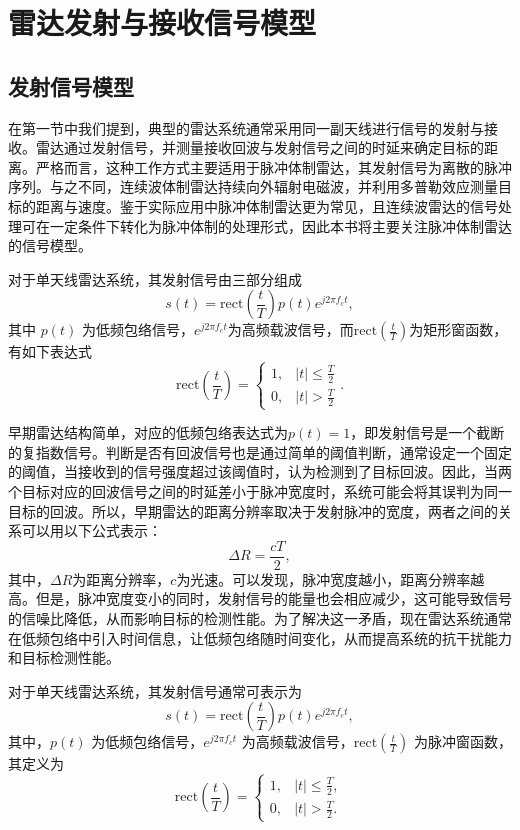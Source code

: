 \chapter{雷达发射与接收信号模型}

\section{发射信号模型}
在第一节中我们提到，典型的雷达系统通常采用同一副天线进行信号的发射与接收。雷达通过发射信号，并测量接收回波与发射信号之间的时延来确定目标的距离。严格而言，这种工作方式主要适用于脉冲体制雷达，其发射信号为离散的脉冲序列。与之不同，连续波体制雷达持续向外辐射电磁波，并利用多普勒效应测量目标的距离与速度。鉴于实际应用中脉冲体制雷达更为常见，且连续波雷达的信号处理可在一定条件下转化为脉冲体制的处理形式，因此本书将主要关注脉冲体制雷达的信号模型。

对于单天线雷达系统，其发射信号由三部分组成
\[
    s(t) = \text{rect}\left(\frac{t}{T}\right) p(t) e^{j 2 \pi f_c t},
\]
其中 \( p(t) \) 为低频包络信号，\( e^{j 2 \pi f_c t} \)为高频载波信号，而\( \text{rect}\left(\frac{t}{T}\right) \)为矩形窗函数，有如下表达式
\[
    \text{rect}\left(\frac{t}{T}\right) =
    \begin{cases}
        1, & |t| \leq \frac{T}{2} \\
        0, & |t| > \frac{T}{2}
    \end{cases}.
\]

早期雷达结构简单，对应的低频包络表达式为\( p(t) = 1 \)，即发射信号是一个截断的复指数信号。判断是否有回波信号也是通过简单的阈值判断，通常设定一个固定的阈值，当接收到的信号强度超过该阈值时，认为检测到了目标回波。因此，当两个目标对应的回波信号之间的时延差小于脉冲宽度时，系统可能会将其误判为同一目标的回波。所以，早期雷达的距离分辨率取决于发射脉冲的宽度，两者之间的关系可以用以下公式表示：
\[
    \Delta R = \frac{cT}{2},
\]
其中，\( \Delta R \)为距离分辨率，\( c \)为光速。可以发现，脉冲宽度越小，距离分辨率越高。但是，脉冲宽度变小的同时，发射信号的能量也会相应减少，这可能导致信号的信噪比降低，从而影响目标的检测性能。为了解决这一矛盾，现在雷达系统通常在低频包络中引入时间信息，让低频包络随时间变化，从而提高系统的抗干扰能力和目标检测性能。

对于单天线雷达系统，其发射信号通常可表示为
\begin{equation}
    s(t) = \text{rect}\left(\frac{t}{T}\right) p(t) e^{j 2 \pi f_c t},
\end{equation}
其中，$p(t)$ 为低频包络信号，$e^{j 2 \pi f_c t}$ 为高频载波信号，$\text{rect}\left(\frac{t}{T}\right)$ 为脉冲窗函数，其定义为
\begin{equation}
    \text{rect}\left(\frac{t}{T}\right) =
    \begin{cases}
        1, & |t| \leq \frac{T}{2}, \\
        0, & |t| > \frac{T}{2}.
    \end{cases}
\end{equation}

